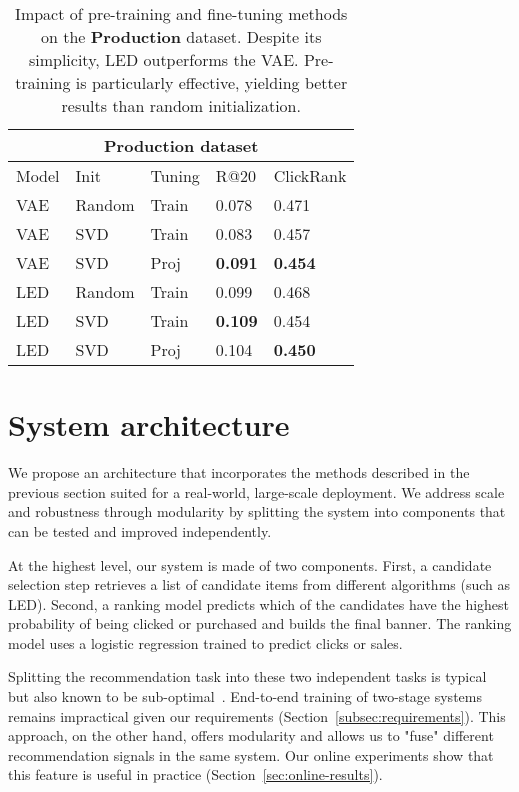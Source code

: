 \documentclass[sigconf]{acmart}
\begin{document}
\begin{table}[h]
\centering
\caption{Impact of pre-training and fine-tuning methods on the \textbf{Production} dataset. Despite its simplicity, LED outperforms the VAE. Pre-training is particularly effective, yielding better results than random initialization.}
\label{table:results-fine-tuning-products}
\begin{tabularx}{.49\textwidth}{|X|X|X|l|l|}
  \hline
    \multicolumn{5}{|c|}{Production dataset} \\
  \hline
    Model & Init & Tuning  & R@20 & ClickRank \\
  \hline
    VAE & Random & Train & 0.078 & 0.471 \\
    VAE & SVD & Train & 0.083 & 0.457 \\
    VAE & SVD & Proj & \textbf{0.091} &\textbf{0.454} \\
  \hline
    LED & Random & Train & 0.099 & 0.468 \\
    LED & SVD & Train & \textbf{0.109} & 0.454 \\
    LED & SVD & Proj & 0.104 & \textbf{0.450} \\
  \hline
    \end{tabularx}
\end{table}


\section{System architecture}
\label{sec:system-architecture}

We propose an architecture that incorporates the methods described in the previous section suited for a real-world, large-scale deployment. We address scale and robustness through modularity by splitting the system into components that can be tested and improved independently.



At the highest level, our system is made of two components. First, a candidate selection step retrieves a list of candidate items from different algorithms (such as LED). Second, a ranking model predicts which of the candidates have the highest probability of being clicked or purchased and builds the final banner. The ranking model uses a logistic regression trained to predict clicks or sales.

Splitting the recommendation task into these two independent tasks is typical~\cite{amazon-deep-2019} but also known to be sub-optimal~\cite{off-policy-reco-www-2020}.  End-to-end training of two-stage systems remains impractical given our requirements (Section~\ref{subsec:requirements}). This approach, on the other hand, offers modularity and allows us to "fuse" different recommendation signals in the same system. Our online experiments show that this feature is useful in practice (Section~\ref{sec:online-results}). 
\end{document}
